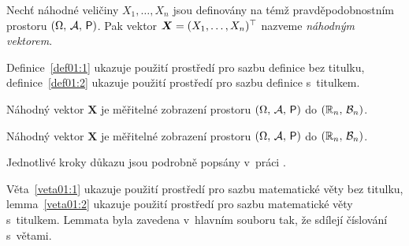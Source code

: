 \begin{definice}\label{def01:2}
  Nechť náhodné veličiny $X_1,\dots,X_n$ jsou definovány na témž
  pravděpodobnostním prostoru $(\Omega,\,\mathcal{A},\,\operatorname{\textsf{P}})$. Pak
  vektor $\bm X = (X_1,\dots,X_n)^\top$ nazveme \emph{náhodným
    vektorem}.
\end{definice}
Definice~\ref{def01:1} ukazuje použití prostředí pro sazbu definice
bez titulku, definice~\ref{def01:2} ukazuje použití prostředí pro
sazbu definice s~titulkem.

\begin{veta}\label{veta01:1}
  Náhodný vektor $\bm X$ je měřitelné zobrazení prostoru
  $(\Omega,\,\mathcal{A},\,\operatorname{\textsf{P}})$ do $(\mathbb{R}_n,\,\mathcal{B}_n)$.
\end{veta}

\begin{lemma}\label{veta01:2}
  Náhodný vektor $\bm X$ je měřitelné zobrazení prostoru
  $(\Omega,\,\mathcal{A},\,\operatorname{\textsf{P}})$ do $(\mathbb{R}_n,\,\mathcal{B}_n)$.
\end{lemma}
\begin{dukaz}
  Jednotlivé kroky důkazu jsou podrobně popsány v~práci \citet[str.
  29]{Andel07}.
\end{dukaz}
Věta~\ref{veta01:1} ukazuje použití prostředí pro sazbu matematické
věty bez titulku, lemma~\ref{veta01:2} ukazuje použití prostředí pro
sazbu matematické věty s~titulkem. Lemmata byla zavedena v~hlavním
souboru tak, že sdílejí číslování s~větami.
